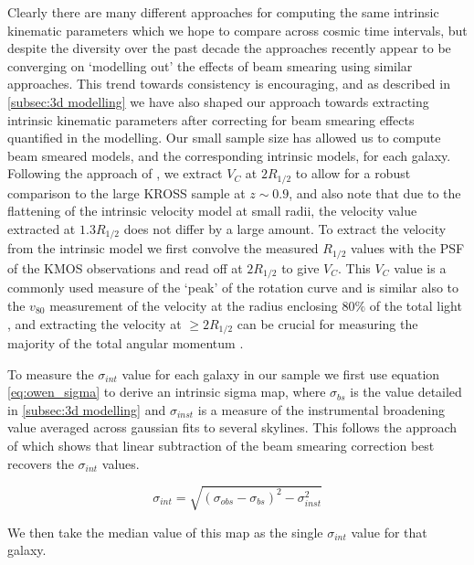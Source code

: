 \documentclass[fleqn,usenatbib]{mn2e}
\begin{document}
Clearly there are many different approaches for computing the same intrinsic kinematic parameters which we hope to compare across cosmic time intervals, but despite the diversity over the past decade the approaches recently appear to be converging on `modelling out' the effects of beam smearing using similar approaches.
This trend towards consistency is encouraging, and as described in \cref{subsec:3d modelling} we have also shaped our approach towards extracting intrinsic kinematic parameters after correcting for beam smearing effects quantified in the modelling.
Our small sample size has allowed us to compute beam smeared models, and the corresponding intrinsic models, for each galaxy.
Following the approach of \cite{Harrison2017}, we extract $V_{C}$ at $2R_{1/2}$ to allow for a robust comparison to the large KROSS sample at $z\sim0.9$, and also note that due to the flattening of the intrinsic velocity model at small radii, the velocity value extracted at $1.3R_{1/2}$ does not differ by a large amount.
To extract the velocity from the intrinsic model we first convolve the measured $R_{1/2}$ values with the PSF of the KMOS observations and read off at $2R_{1/2}$ to give $V_{C}$.
This $V_{C}$ value is a commonly used measure of the `peak' of the rotation curve \citep[e.g.][]{Miller2011,Pelliccia2016,Stott2016,Harrison2017} and is similar also to the $v_{80}$ measurement of the velocity at the radius enclosing 80$\%$ of the total light \citep{Tiley2016a}, and extracting the velocity at $\geqslant 2R_{1/2}$ can be crucial for measuring the majority of the total angular momentum \citep[e.g.]{Obreschkow2015,Harrison2017}.

To measure the $\sigma_{int}$ value for each galaxy in our sample we first use equation \ref{eq:owen_sigma} to derive an intrinsic sigma map, where $\sigma_{bs}$ is the value detailed in \cref{subsec:3d modelling} and $\sigma_{inst}$ is a measure of the instrumental broadening value averaged across gaussian fits to several skylines.
This follows the approach of \cite{Stott2016} which shows that linear subtraction of the beam smearing correction best recovers the $\sigma_{int}$ values. 

\begin{equation}\label{eq:owen_sigma}
   \sigma_{int} = \sqrt{\left(\sigma_{obs} - \sigma_{bs} \right)^{2} - \sigma_{inst}^{2}}
\end{equation}

We then take the median value of this map as the single $\sigma_{int}$ value for that galaxy.
\end{document}
